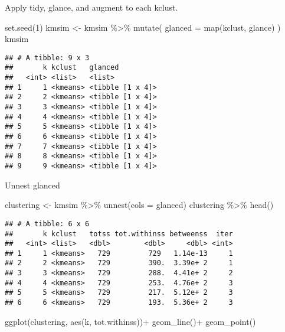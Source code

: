 \documentclass[
]{article}
\newenvironment{Shaded}{\begin{snugshade}}{\end{snugshade}}
\newcommand{\AttributeTok}[1]{\textcolor[rgb]{0.77,0.63,0.00}{#1}}
\newcommand{\DecValTok}[1]{\textcolor[rgb]{0.00,0.00,0.81}{#1}}
\newcommand{\FunctionTok}[1]{\textcolor[rgb]{0.00,0.00,0.00}{#1}}
\newcommand{\NormalTok}[1]{#1}
\newcommand{\OtherTok}[1]{\textcolor[rgb]{0.56,0.35,0.01}{#1}}
\newcommand{\SpecialCharTok}[1]{\textcolor[rgb]{0.00,0.00,0.00}{#1}}
\begin{document}
Apply tidy, glance, and augment to each kclust.

\begin{Shaded}
\begin{Highlighting}[]
\FunctionTok{set.seed}\NormalTok{(}\DecValTok{1}\NormalTok{)}
\NormalTok{kmsim }\OtherTok{\textless{}{-}}\NormalTok{ kmsim }\SpecialCharTok{\%\textgreater{}\%} 
\FunctionTok{mutate}\NormalTok{(}
  \AttributeTok{glanced =} \FunctionTok{map}\NormalTok{(kclust, glance)}
\NormalTok{)}
\NormalTok{kmsim}
\end{Highlighting}
\end{Shaded}

\begin{verbatim}
## # A tibble: 9 x 3
##       k kclust   glanced         
##   <int> <list>   <list>          
## 1     1 <kmeans> <tibble [1 x 4]>
## 2     2 <kmeans> <tibble [1 x 4]>
## 3     3 <kmeans> <tibble [1 x 4]>
## 4     4 <kmeans> <tibble [1 x 4]>
## 5     5 <kmeans> <tibble [1 x 4]>
## 6     6 <kmeans> <tibble [1 x 4]>
## 7     7 <kmeans> <tibble [1 x 4]>
## 8     8 <kmeans> <tibble [1 x 4]>
## 9     9 <kmeans> <tibble [1 x 4]>
\end{verbatim}

Unnest glanced

\begin{Shaded}
\begin{Highlighting}[]
\NormalTok{clustering }\OtherTok{\textless{}{-}}
\NormalTok{  kmsim }\SpecialCharTok{\%\textgreater{}\%} 
  \FunctionTok{unnest}\NormalTok{(}\AttributeTok{cols =}\NormalTok{ glanced)}
\NormalTok{clustering }\SpecialCharTok{\%\textgreater{}\%} \FunctionTok{head}\NormalTok{()}
\end{Highlighting}
\end{Shaded}

\begin{verbatim}
## # A tibble: 6 x 6
##       k kclust   totss tot.withinss betweenss  iter
##   <int> <list>   <dbl>        <dbl>     <dbl> <int>
## 1     1 <kmeans>   729         729   1.14e-13     1
## 2     2 <kmeans>   729         390.  3.39e+ 2     1
## 3     3 <kmeans>   729         288.  4.41e+ 2     2
## 4     4 <kmeans>   729         253.  4.76e+ 2     3
## 5     5 <kmeans>   729         217.  5.12e+ 2     3
## 6     6 <kmeans>   729         193.  5.36e+ 2     3
\end{verbatim}

\begin{Shaded}
\begin{Highlighting}[]
\FunctionTok{ggplot}\NormalTok{(clustering, }\FunctionTok{aes}\NormalTok{(k, tot.withinss))}\SpecialCharTok{+}
  \FunctionTok{geom\_line}\NormalTok{()}\SpecialCharTok{+}
  \FunctionTok{geom\_point}\NormalTok{()}
\end{Highlighting}
\end{Shaded}
\end{document}
